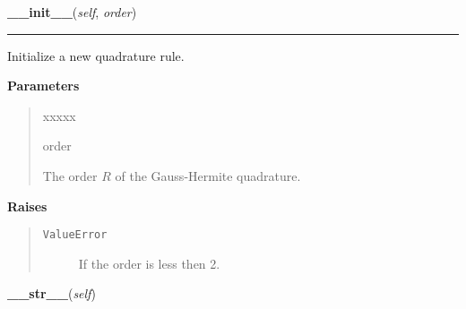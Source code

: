 \hspace{.8\funcindent}\begin{boxedminipage}{\funcwidth}

    \raggedright \textbf{\_\_init\_\_}(\textit{self}, \textit{order})

    \vspace{-1.5ex}

    \rule{\textwidth}{0.5\fboxrule}
\setlength{\parskip}{2ex}
    Initialize a new quadrature rule.

\setlength{\parskip}{1ex}
      \textbf{Parameters}
      \vspace{-1ex}

      \begin{quote}
        \begin{Ventry}{xxxxx}

          \item[order]

          The order $R$ of the Gauss-Hermite quadrature.

        \end{Ventry}

      \end{quote}

      \textbf{Raises}
    \vspace{-1ex}

      \begin{quote}
        \begin{description}

          \item[\texttt{ValueError}]

          If the order is less then 2.

        \end{description}

      \end{quote}

    \end{boxedminipage}

    \label{Quadrator:Quadrator:__str__}

    \vspace{0.5ex}

\hspace{.8\funcindent}\begin{boxedminipage}{\funcwidth}

    \raggedright \textbf{\_\_str\_\_}(\textit{self})

\setlength{\parskip}{2ex}
\setlength{\parskip}{1ex}
    \end{boxedminipage}

